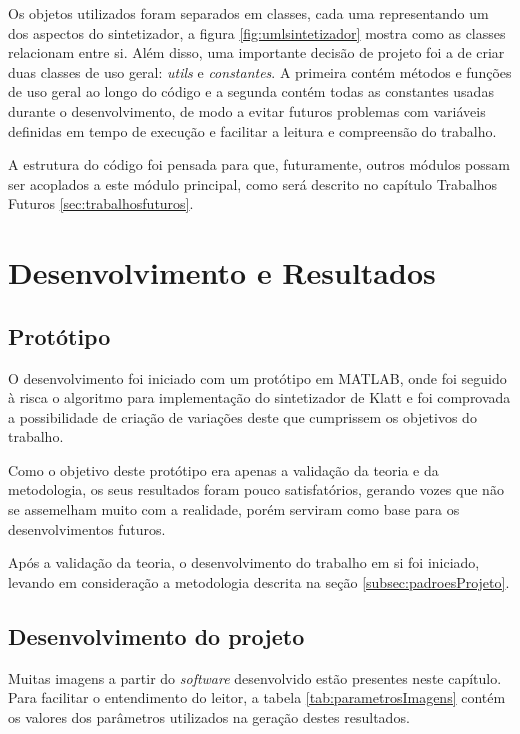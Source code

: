 \documentclass[
  12pt,       
  openright,      
  twoside,      
  a4paper,      
  english,      
  french,       
  spanish,      
  brazil,     
  ]{abntex2}
\begin{document}
Os objetos utilizados foram separados em classes, cada uma representando um dos aspectos do sintetizador, a figura \ref{fig:umlsintetizador} mostra como as classes relacionam entre si. Além disso, uma importante decisão de projeto foi a de criar duas classes de uso geral: \textit{utils} e \textit{constantes}. A primeira contém métodos e funções de uso geral ao longo do código e a segunda contém todas as constantes usadas durante o desenvolvimento, de modo a evitar futuros problemas com variáveis definidas em tempo de execução e facilitar a leitura e compreensão do trabalho.

A estrutura do código foi pensada para que, futuramente, outros módulos possam ser acoplados a este módulo principal, como será descrito no capítulo Trabalhos Futuros \ref{sec:trabalhosfuturos}.

\chapter{Desenvolvimento e Resultados}
\section{Protótipo}
O desenvolvimento foi iniciado com um protótipo em MATLAB, onde foi seguido à risca o algoritmo para implementação do sintetizador de Klatt e foi comprovada a possibilidade de criação de variações deste que cumprissem os objetivos do trabalho.

Como o objetivo deste protótipo era apenas a validação da teoria e da metodologia, os seus resultados foram pouco satisfatórios, gerando vozes que não se assemelham muito com a realidade, porém serviram como base para os desenvolvimentos futuros.

Após a validação da teoria, o desenvolvimento do trabalho em si foi iniciado, levando em consideração a metodologia descrita na seção \ref{subsec:padroesProjeto}.

\section{Desenvolvimento do projeto}
Muitas imagens a partir do \textit{software} desenvolvido estão presentes neste capítulo. Para facilitar o entendimento do leitor, a tabela \ref{tab:parametrosImagens} contém os valores dos parâmetros utilizados na geração destes resultados.
\end{document}
